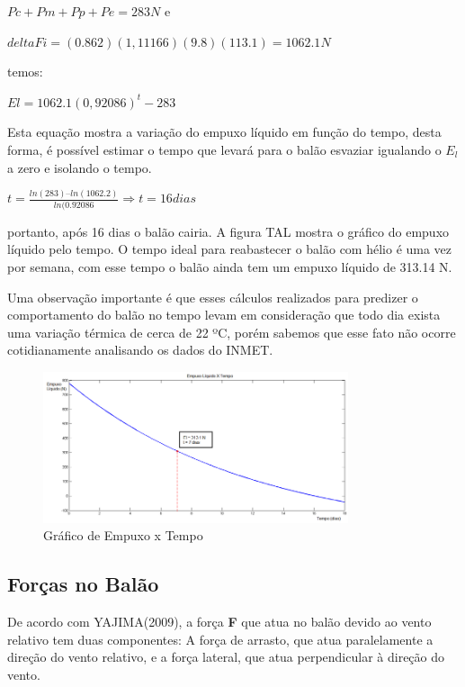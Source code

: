 	 $Pc + Pm + Pp+Pe = 283 N$   e

	 $deltaFi = (0.862)(1,11166)(9.8)(113.1) = 1062.1 N$

	temos:

	 $El = 1062.1(0,92086)^t - 283$

	Esta equação mostra a variação do empuxo líquido em função do tempo, desta forma, é possível estimar o tempo que levará para o balão esvaziar igualando o $E_l$ a zero e isolando o tempo.

	$t = \frac{ln(283) – ln(1062.2)}{ln(0.92086} \Rightarrow t = 16 dias$

	portanto, após 16 dias o balão cairia. A figura TAL mostra o gráfico do empuxo líquido pelo tempo. O tempo ideal para reabastecer o balão com hélio é uma vez por semana, com esse tempo o balão ainda tem um empuxo líquido de 313.14 N.

	Uma observação importante é que esses cálculos realizados para predizer o comportamento do balão no tempo levam em consideração que todo dia exista uma variação térmica de cerca de 22 ºC, porém sabemos que esse fato não ocorre cotidianamente analisando os dados do INMET.

	\begin{figure}[H]
		\centering
		\includegraphics[width=0.8\textwidth]{figuras/empuxoLiquidoTempo}
		\caption{Gráfico de Empuxo x Tempo}
		\label{img:empuxoLiquidoTempo}
	\end{figure}

\subsection{Forças no Balão} %
\label{sub:for_as_no_bal_o}

De acordo com YAJIMA(2009), a força \textbf{F} que atua no balão devido ao vento relativo tem duas componentes: A força de arrasto, que atua paralelamente a direção do vento relativo, e a força lateral, que atua perpendicular à direção do vento.

